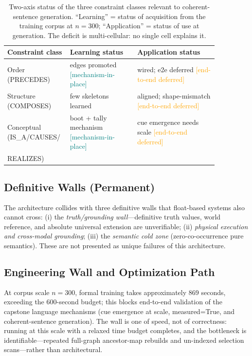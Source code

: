 \documentclass[11pt,a4paper]{article}
\newcommand{\statusmech}{\textcolor{teal}{\small\textsf{[mechanism-in-place]}}}
\newcommand{\statusdeferred}{\textcolor{orange}{\small\textsf{[end-to-end deferred]}}}
\begin{document}
\begin{table}[t]
\centering
\small
\caption{Two-axis status of the three constraint classes relevant to
coherent-sentence generation. ``Learning'' = status of acquisition from
the training corpus at $n{=}300$; ``Application'' = status of use at
generation. The deficit is multi-cellular: no single cell explains it.}
\label{tab:twoaxis}
\begin{tabular}{@{}p{0.20\linewidth}p{0.30\linewidth}p{0.36\linewidth}@{}}
\toprule
Constraint class & Learning status & Application status \\
\midrule
Order (PRECEDES)            & edges promoted \statusmech       & wired; e2e deferred \statusdeferred \\
Structure (COMPOSES)        & few skeletons learned            & aligned; shape-mismatch \statusdeferred \\
Conceptual (IS\_A/CAUSES/   & boot + tally mechanism \statusmech & cue emergence needs scale \statusdeferred \\
\quad REALIZES)             &                                  & \\
\bottomrule
\end{tabular}
\end{table}

\subsection{Definitive Walls (Permanent)}
The architecture collides with three definitive walls that float-based
systems also cannot cross: (i) the \emph{truth/grounding wall}---definitive
truth values, world reference, and absolute universal extension are
unverifiable; (ii) \emph{physical execution and cross-modal grounding};
(iii) the \emph{semantic cold zone} (zero-co-occurrence pure semantics).
These are not presented as unique failures of this architecture.

\subsection{Engineering Wall and Optimization Path}
\label{sec:lim-perf}
At corpus scale $n=300$, formal training takes approximately 869 seconds,
exceeding the 600-second budget; this blocks end-to-end validation of the
capstone language mechanisms (cue emergence at scale, measured=True, and
coherent-sentence generation). The wall is one of speed, not of
correctness: running at this scale with a relaxed time budget completes,
and the bottleneck is identifiable---repeated full-graph ancestor-map
rebuilds and un-indexed selection scans---rather than architectural.
\end{document}
